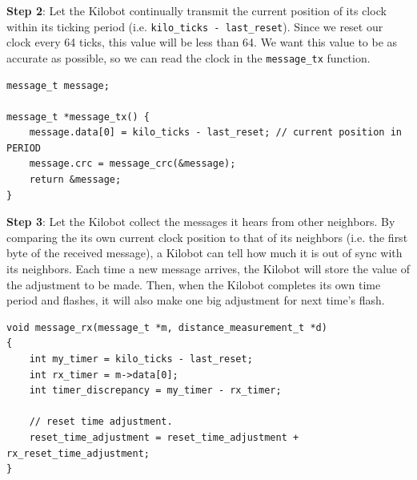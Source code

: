 \noindent \textbf{Step  2}: Let the Kilobot continually transmit the current position of its clock within its ticking period (i.e. \texttt{kilo\_ticks - last\_reset}). Since we reset our clock every 64 ticks, this value will be less than 64. We want this value to be as accurate as possible, so we can read the clock in the \texttt{message\_tx} function. 
\begin{verbatim}
message_t message;

message_t *message_tx() {
    message.data[0] = kilo_ticks - last_reset; // current position in PERIOD
    message.crc = message_crc(&message);
    return &message;
}
\end{verbatim}

\noindent \textbf{Step 3}: Let the Kilobot collect the messages it hears from other neighbors. By comparing the its own current clock position to that of its neighbors (i.e. the first byte of the received message), a Kilobot can tell how much it is out of sync with its neighbors. Each time a new message arrives, the Kilobot will store the value of the adjustment to be made. Then, when the Kilobot completes its own time period and flashes, it will also make one big adjustment for next time's flash.

\begin{verbatim}
void message_rx(message_t *m, distance_measurement_t *d)
{
    int my_timer = kilo_ticks - last_reset;
    int rx_timer = m->data[0];
    int timer_discrepancy = my_timer - rx_timer;
    
    // reset time adjustment.
    reset_time_adjustment = reset_time_adjustment + 	rx_reset_time_adjustment;
}
\end{verbatim}
\newpage
